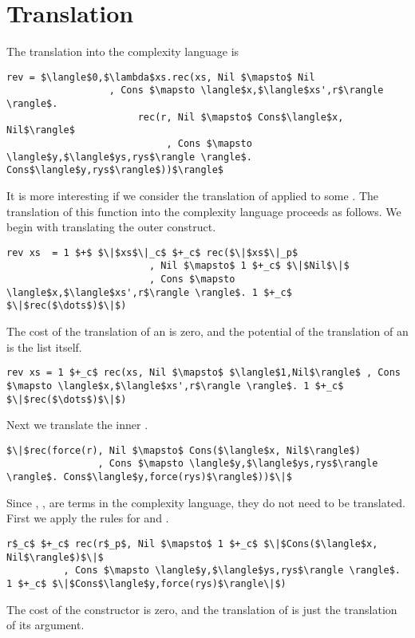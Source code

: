 \section{Translation}
%
The translation into the complexity language is
%
\begin{lstlisting}
rev = $\langle$0,$\lambda$xs.rec(xs, Nil $\mapsto$ Nil
                  , Cons $\mapsto \langle$x,$\langle$xs',r$\rangle \rangle$.
                       rec(r, Nil $\mapsto$ Cons$\langle$x, Nil$\rangle$
                            , Cons $\mapsto \langle$y,$\langle$ys,rys$\rangle \rangle$. Cons$\langle$y,rys$\rangle$))$\rangle$
\end{lstlisting}
%
It is more interesting if we consider the translation of  applied to
some .  The translation of this function into the complexity
language proceeds as follows.  We begin with translating the  outer 
construct.
%
\begin{lstlisting}
rev xs  = 1 $+$ $\|$xs$\|_c$ $+_c$ rec($\|$xs$\|_p$
                         , Nil $\mapsto$ 1 $+_c$ $\|$Nil$\|$
                         , Cons $\mapsto \langle$x,$\langle$xs',r$\rangle \rangle$. 1 $+_c$ $\|$rec($\dots$)$\|$)
\end{lstlisting}
%
The cost of the translation of an  is zero, and the potential of the
translation of an  is the list itself.
%
\begin{lstlisting}
rev xs = 1 $+_c$ rec(xs, Nil $\mapsto$ $\langle$1,Nil$\rangle$ , Cons $\mapsto \langle$x,$\langle$xs',r$\rangle \rangle$. 1 $+_c$ $\|$rec($\dots$)$\|$)
\end{lstlisting}
%
Next we translate the inner .
%
\begin{lstlisting}
$\|$rec(force(r), Nil $\mapsto$ Cons($\langle$x, Nil$\rangle$)
                , Cons $\mapsto \langle$y,$\langle$ys,rys$\rangle \rangle$. Cons$\langle$y,force(rys)$\rangle$))$\|$
\end{lstlisting}
%
Since , ,  are terms in the complexity language, they do not
need to be translated.  First we apply the rules for  and .
%
\begin{lstlisting}
r$_c$ $+_c$ rec(r$_p$, Nil $\mapsto$ 1 $+_c$ $\|$Cons($\langle$x, Nil$\rangle$)$\|$
          , Cons $\mapsto \langle$y,$\langle$ys,rys$\rangle \rangle$. 1 $+_c$ $\|$Cons$\langle$y,force(rys)$\rangle\|$)
\end{lstlisting}
%
The cost of the  constructor is zero, and the translation of 
is just the translation of its argument.
